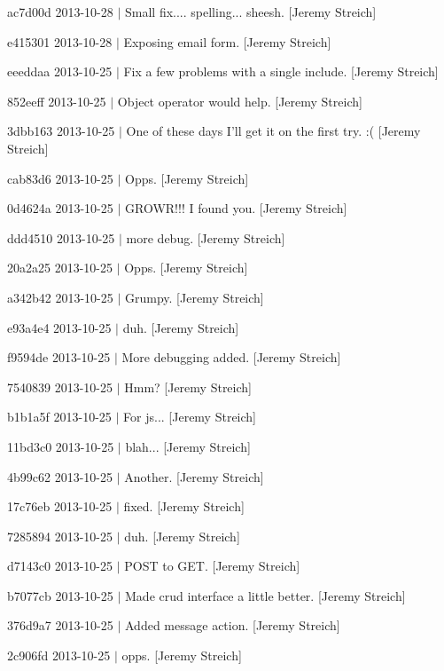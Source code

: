 \begin{DoxyItemize}
\item ac7d00d 2013-\/10-\/28 $|$ Small fix.... spelling... sheesh. \mbox{[}Jeremy Streich\mbox{]}
\item e415301 2013-\/10-\/28 $|$ Exposing email form. \mbox{[}Jeremy Streich\mbox{]}
\item eeeddaa 2013-\/10-\/25 $|$ Fix a few problems with a single include. \mbox{[}Jeremy Streich\mbox{]}
\item 852eeff 2013-\/10-\/25 $|$ Object operator would help. \mbox{[}Jeremy Streich\mbox{]}
\item 3dbb163 2013-\/10-\/25 $|$ One of these days I'll get it on the first try. \-:( \mbox{[}Jeremy Streich\mbox{]}
\item cab83d6 2013-\/10-\/25 $|$ Opps. \mbox{[}Jeremy Streich\mbox{]}
\item 0d4624a 2013-\/10-\/25 $|$ G\-R\-O\-W\-R!!! I found you. \mbox{[}Jeremy Streich\mbox{]}
\item ddd4510 2013-\/10-\/25 $|$ more debug. \mbox{[}Jeremy Streich\mbox{]}
\item 20a2a25 2013-\/10-\/25 $|$ Opps. \mbox{[}Jeremy Streich\mbox{]}
\item a342b42 2013-\/10-\/25 $|$ Grumpy. \mbox{[}Jeremy Streich\mbox{]}
\item e93a4e4 2013-\/10-\/25 $|$ duh. \mbox{[}Jeremy Streich\mbox{]}
\item f9594de 2013-\/10-\/25 $|$ More debugging added. \mbox{[}Jeremy Streich\mbox{]}
\item 7540839 2013-\/10-\/25 $|$ Hmm? \mbox{[}Jeremy Streich\mbox{]}
\item b1b1a5f 2013-\/10-\/25 $|$ For js... \mbox{[}Jeremy Streich\mbox{]}
\item 11bd3c0 2013-\/10-\/25 $|$ blah... \mbox{[}Jeremy Streich\mbox{]}
\item 4b99c62 2013-\/10-\/25 $|$ Another. \mbox{[}Jeremy Streich\mbox{]}
\item 17c76eb 2013-\/10-\/25 $|$ fixed. \mbox{[}Jeremy Streich\mbox{]}
\item 7285894 2013-\/10-\/25 $|$ duh. \mbox{[}Jeremy Streich\mbox{]}
\item d7143c0 2013-\/10-\/25 $|$ P\-O\-S\-T to G\-E\-T. \mbox{[}Jeremy Streich\mbox{]}
\item b7077cb 2013-\/10-\/25 $|$ Made crud interface a little better. \mbox{[}Jeremy Streich\mbox{]}
\item 376d9a7 2013-\/10-\/25 $|$ Added message action. \mbox{[}Jeremy Streich\mbox{]}
\item 2c906fd 2013-\/10-\/25 $|$ opps. \mbox{[}Jeremy Streich\mbox{]}

\end{DoxyItemize}
